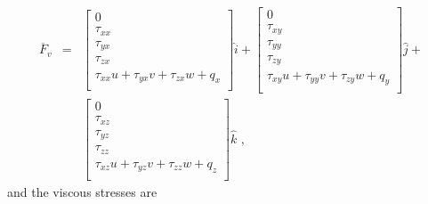 \begin{eqnarray}
 \overline{F}_{v} & = & \left [ 
                            \begin{array}{c} 
                                0 \\
                                \tau_{xx} \\
                                \tau_{yx} \\
                                \tau_{zx} \\
                                \tau_{xx} u + \tau_{yx} v + \tau_{zx} w + q_{x} \\
                            \end{array}
                          \right ] \hat{i} 
                        + \left [ 
                             \begin{array}{c}
                                 0 \\
                                 \tau_{xy} \\
                                 \tau_{yy} \\
                                 \tau_{zy} \\
                                 \tau_{xy} u + \tau_{yy} v + \tau_{zy} w + q_{y} \\
                             \end{array}
                          \right ] \hat{j}  + \nonumber \\
                  &   &   \left [
                             \begin{array}{c}
                                 0 \\
                                 \tau_{xz} \\
                                 \tau_{yz} \\
                                 \tau_{zz} \\
                                 \tau_{xz} u + \tau_{yz} v + \tau_{zz} w + q_{z} \\
                             \end{array}
                          \right ] \hat{k} \text{ , }
 \label{eq:F_v_3D}
\end{eqnarray}
and the viscous stresses are
